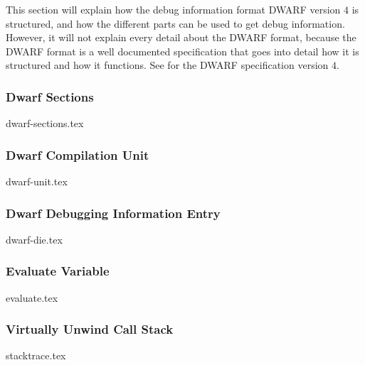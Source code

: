  


This section will explain how the debug information format \acrfull{DWARF} version $4$ is structured, and how the different parts can be used to get debug information.
However, it will not explain every detail about the \gls{DWARF} format, because the \gls{DWARF} format is a well documented specification that goes into detail how it is structured and how it functions.
See \cite{dwarf} for the \gls{DWARF} specification version $4$.


\subsubsection{Dwarf Sections}
{dwarf-sections.tex}


\subsubsection{Dwarf Compilation Unit}
{dwarf-unit.tex}


\subsubsection{Dwarf Debugging Information Entry}
{dwarf-die.tex}


\subsubsection{Evaluate Variable}
\label{sec:evaluate-variable}
{evaluate.tex}


\subsubsection{Virtually Unwind Call Stack}
\label{sec:stacktrace}
{stacktrace.tex}

